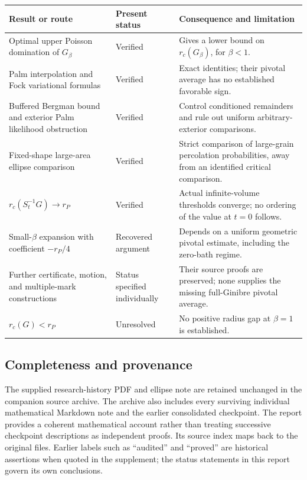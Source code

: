 \documentclass[11pt,a4paper]{article}
\theoremstyle{definition}
\theoremstyle{remark}
\numberwithin{equation}{section}
\begin{document}
\begin{longtable}{@{}L{0.36\textwidth}L{0.20\textwidth}L{0.37\textwidth}@{}}
\toprule
Result or route & Present status & Consequence and limitation\\
\midrule
\endhead
Optimal upper Poisson domination of \(G_\beta\)
& Verified & Gives a lower bound on \(r_c(G_\beta)\), for \(\beta<1\).\\[3pt]
Palm interpolation and Fock variational formulas
& Verified & Exact identities; their pivotal average has no established favorable sign.\\[3pt]
Buffered Bergman bound and exterior Palm likelihood obstruction
& Verified & Control conditioned remainders and rule out uniform arbitrary-exterior comparisons.\\[3pt]
Fixed-shape large-area ellipse comparison
& Verified & Strict comparison of large-grain percolation probabilities, away from an identified critical comparison.\\[3pt]
\(r_c(S_t^{-1}G)\to r_P\)
& Verified & Actual infinite-volume thresholds converge; no ordering of the value at \(t=0\) follows.\\[3pt]
Small-\(\beta\) expansion with coefficient \(-r_P/4\)
& Recovered argument & Depends on a uniform geometric pivotal estimate, including the zero-bath regime.\\[3pt]
Further certificate, motion, and multiple-mark constructions
& Status specified individually & Their source proofs are preserved; none supplies the missing full-Ginibre pivotal average.\\[3pt]
\(r_c(G)<r_P\)
& Unresolved & No positive radius gap at \(\beta=1\) is established.\\
\bottomrule
\end{longtable}

\subsection*{Completeness and provenance}
The supplied research-history PDF and ellipse note are retained unchanged
in the companion source archive. The archive also includes every surviving
individual mathematical Markdown note and the earlier consolidated checkpoint.
The report provides a coherent mathematical account rather than treating
successive checkpoint descriptions as independent proofs. Its source index
maps back to the original files. Earlier labels such as ``audited'' and
``proved'' are historical assertions when quoted in the supplement;
the status statements in this report govern its own conclusions.
\end{document}
